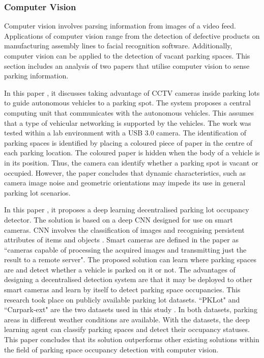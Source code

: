 \subsubsection*{Computer Vision}
Computer vision involves parsing information from images of a video feed. Applications of computer vision range from the detection of defective products on manufacturing assembly lines to facial recognition software. Additionally, computer vision can be applied to the detection of vacant parking spaces. This section includes an analysis of two papers that utilise computer vision to sense parking information.

In this paper \citep{cho_automatic_2016}, it discusses taking advantage of CCTV cameras inside parking lots to guide autonomous vehicles to a parking spot. The system proposes a central computing unit that communicates with the autonomous vehicles. This assumes that a type of vehicular networking is supported by the vehicles. The work was tested within a lab environment with a USB 3.0 camera. The identification of parking spaces is identified by placing a coloured piece of paper in the centre of each parking location. The coloured paper is hidden when the body of a vehicle is in its position. Thus, the camera can identify whether a parking spot is vacant or occupied. However, the paper concludes that dynamic characteristics, such as camera image noise and geometric orientations may impede its use in general parking lot scenarios.

In this paper \citep{amato_deep_2017}, it proposes a deep learning decentralised parking lot occupancy detector. The solution is based on a deep \ac{CNN} designed for use on smart cameras. \ac{CNN} involves the classification of images and recognising persistent attributes of items and objects \citep{Krizhevsky2012ImageNetNetworks}. Smart cameras are defined in the paper as ``cameras capable of processing the acquired images and transmitting just the result to a remote server". The proposed solution can learn where parking spaces are and detect whether a vehicle is parked on it or not. The advantages of designing a decentralised detection system are that it may be deployed to other smart cameras and learn by itself to detect parking space occupancies. This research took place on publicly available parking lot datasets. ``PKLot" and ``Cnrpark-ext" are the two datasets used in this study \citep{2017PKLot, 2017CNR-EXT}. In both datasets, parking areas in different weather conditions are available. With the datasets, the deep learning agent can classify parking spaces and detect their occupancy statuses. This paper concludes that its solution outperforms other existing solutions within the field of parking space occupancy detection with computer vision.

